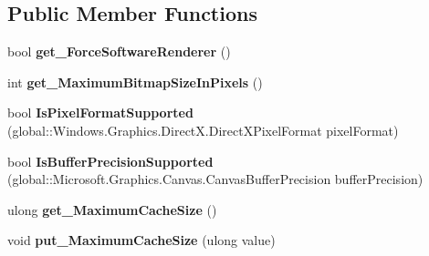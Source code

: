 \subsection*{Public Member Functions}
\begin{DoxyCompactItemize}
\item 
\mbox{\label{interface_microsoft_1_1_graphics_1_1_canvas_1_1_i_canvas_device_a71ebd55a219b2267a83a68fa3caf42a0}} 
bool {\bfseries get\+\_\+\+Force\+Software\+Renderer} ()
\item 
\mbox{\label{interface_microsoft_1_1_graphics_1_1_canvas_1_1_i_canvas_device_a898fb605ef7e1454030d832f6091f198}} 
int {\bfseries get\+\_\+\+Maximum\+Bitmap\+Size\+In\+Pixels} ()
\item 
\mbox{\label{interface_microsoft_1_1_graphics_1_1_canvas_1_1_i_canvas_device_a1bbc8a4c7b32d66babc6a466f3947580}} 
bool {\bfseries Is\+Pixel\+Format\+Supported} (global\+::\+Windows.\+Graphics.\+Direct\+X.\+Direct\+X\+Pixel\+Format pixel\+Format)
\item 
\mbox{\label{interface_microsoft_1_1_graphics_1_1_canvas_1_1_i_canvas_device_acfa5f7ea5e23895e632195b070bb4023}} 
bool {\bfseries Is\+Buffer\+Precision\+Supported} (global\+::\+Microsoft.\+Graphics.\+Canvas.\+Canvas\+Buffer\+Precision buffer\+Precision)
\item 
\mbox{\label{interface_microsoft_1_1_graphics_1_1_canvas_1_1_i_canvas_device_a4004fcfc71e1035a4e3e56590d32a11a}} 
ulong {\bfseries get\+\_\+\+Maximum\+Cache\+Size} ()
\item 
\mbox{\label{interface_microsoft_1_1_graphics_1_1_canvas_1_1_i_canvas_device_a3812c813e00bdc30b376b38962b40ba7}} 
void {\bfseries put\+\_\+\+Maximum\+Cache\+Size} (ulong value)
\item 
\mbox{\label{interface_microsoft_1_1_graphics_1_1_canvas_1_1_i_canvas_device_a8e974c9c2295757c25f1c270c662d0df}} 

\end{DoxyCompactItemize}
